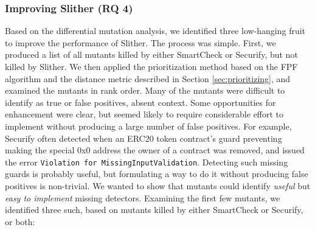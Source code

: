 \subsubsection{Improving Slither {\bf (RQ 4)}}

Based on the differential mutation analysis, we identified three low-hanging fruit to improve the performance of Slither.  The process was simple.  First, we produced a list of all mutants killed by either SmartCheck or Securify, but not killed by Slither.  We then applied the prioritization method based on the FPF algorithm and the distance metric described in Section \ref{sec:prioritizing}, and examined the mutants in rank order.  Many of the mutants were difficult to identify as true or false positives, absent context.  Some opportunities for enhancement were clear, but seemed likely to require considerable effort to implement without producing a large number of false positives.  For example, Securify often detected when an ERC20 token contract's guard preventing making the special 0x0 address the owner of a contract was removed, and issued the error {\tt Violation for MissingInputValidation}. Detecting such missing guards is probably useful, but formulating a way to do it without producing false positives is non-trivial.  We wanted to show that mutants could identify \emph{useful} but \emph{easy to implement} missing detectors.  Examining the first few mutants, we identified three such, based on mutants killed by either SmartCheck or Securify, or both:

